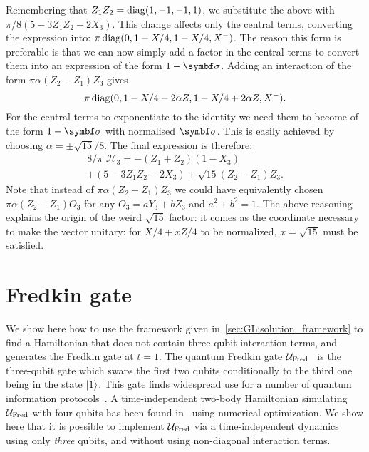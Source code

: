 Remembering that $Z_1 Z_2 = \operatorname{diag}(1, -1, -1, 1)$, we substitute the above with
$\pi/8(5 - 3Z_1 Z_2 - 2X_3)$.
This change affects only the central terms, converting the expression into:
$\pi \operatorname{diag}(0, 1 - X/4, 1 - X/4, X^-)$.
The reason this form is preferable is that we can now simply add a factor in the central terms to convert them into an expression of the form $1 - \bs\sigma$.
Adding an interaction of the form $\pi \alpha (Z_2 - Z_1)Z_3$ gives
\begin{equation}
	\pi\operatorname{diag}(0, 1 - X/4 - 2\alpha Z, 1 - X/4 + 2\alpha Z, X^-).
\end{equation}
For the central terms to exponentiate to the identity we need them to become of the form $1-\bs\sigma$ with normalised $\bs\sigma$.
This is easily achieved by choosing $\alpha=\pm\sqrt{15}/8$.
The final expression is therefore:
\begin{equation}
\begin{aligned}
	8/\pi \,\, \mathcal H_3 = -(Z_1 + Z_2)(1 - X_3) \\+ (5 - 3Z_1Z_2 - 2 X_3)
				 \pm \sqrt{15} (Z_2 - Z_1)Z_3.
\end{aligned}
\end{equation}
Note that instead of $\pi \alpha (Z_2 - Z_1)Z_3$ we could have equivalently chosen
$\pi\alpha(Z_2-Z_1)O_3$ for any $O_3 = a Y_3 + b Z_3$ and $a^2 + b^2 = 1$.
The above reasoning explains the origin of the weird $\sqrt{15}$ factor: it comes as the coordinate necessary to make the vector unitary: for $X/4 + x Z / 4$ to be normalized, $x = \sqrt{15}$ must be satisfied.

\section{Fredkin gate}
\label{sec:GL:fredkin}

We show here how to use the framework given in~\cref{sec:GL:solution_framework} to find a Hamiltonian that does not contain three-qubit interaction terms, and generates the Fredkin gate at $t=1$.
The quantum Fredkin gate ${\mathcal{U}}_{\operatorname{Fred}}$~\cite{fredkin1982conservative} is the three-qubit gate which swaps the first two qubits conditionally to the third one being in the state $\ket1$.
This gate finds widespread use for a number of quantum information protocols~\cite{patel2016quantum,loft2018quantum}.
A time-independent two-body Hamiltonian simulating ${\mathcal{U}}_{\operatorname{Fred}}$ with four qubits has been found in~\cite{banchi2016quantum} using numerical optimization.
We show here that it is possible to implement ${\mathcal{U}}_{\operatorname{Fred}}$ via a time-independent dynamics using only \textit{three} qubits, and without using non-diagonal interaction terms.

